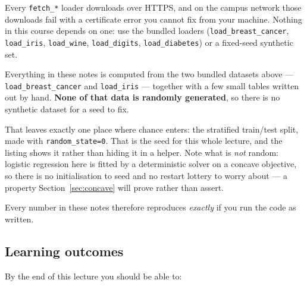 \documentclass[11pt]{article}
\begin{document}
\begin{caution}
Every \texttt{fetch\_*} loader downloads over HTTPS, and on the campus network
those downloads fail with a certificate error you cannot fix from your machine.
Nothing in this course depends on one: use the bundled loaders
(\texttt{load\_breast\_cancer}, \texttt{load\_iris}, \texttt{load\_wine},
\texttt{load\_digits}, \texttt{load\_diabetes}) or a fixed-seed synthetic set.
\end{caution}

\begin{keyidea}
Everything in these notes is computed from the two bundled datasets above ---
\texttt{load\_breast\_cancer} and \texttt{load\_iris} --- together with a few
small tables written out by hand. \textbf{None of that data is randomly
generated}, so there is no synthetic dataset for a seed to fix.

That leaves exactly one place where chance enters: the stratified train/test
split, made with \texttt{random\_state=0}. That is the seed for this whole
lecture, and the listing shows it rather than hiding it in a helper. Note what
is \emph{not} random: logistic regression here is fitted by a deterministic
solver on a concave objective, so there is no initialisation to seed and no
restart lottery to worry about --- a property Section~\ref{sec:concave} will
prove rather than assert.

Every number in these notes therefore reproduces \emph{exactly} if you run the
code as written.
\end{keyidea}

\subsection{Learning outcomes}

By the end of this lecture you should be able to:
\end{document}
